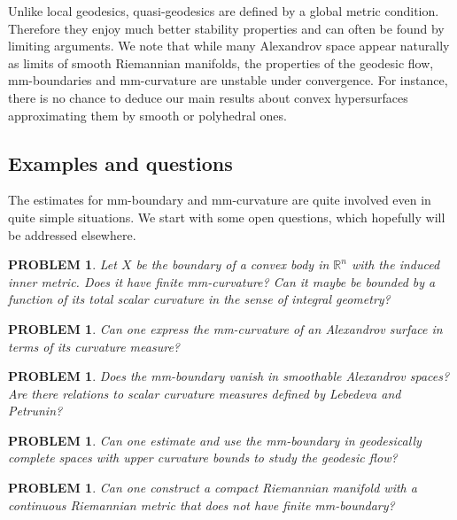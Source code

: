 \documentclass[12pt,leqno]{amsart}
\numberwithin{equation}{section}
\newtheorem{quest}[thm]{PROBLEM}
\theoremstyle{definition}
\theoremstyle{remark}
\newcommand{\R}{\mathbb{R}}
\begin{document}
Unlike local geodesics, quasi-geodesics are defined by a global metric condition. Therefore they enjoy much better stability properties
and can often be found by limiting arguments.
We note that while many Alexandrov space appear naturally  as limits of smooth Riemannian manifolds, the properties of the geodesic flow, mm-boundaries and mm-curvature are unstable under
convergence.  
For instance, there is  no chance to deduce our main results about convex hypersurfaces approximating them by smooth or polyhedral ones.



\subsection{Examples and questions} \label{subsec:example}
The estimates for mm-boundary and mm-curvature are quite involved even in  quite  simple situations.
We start with some open questions, which hopefully will be addressed elsewhere.










\begin{quest} Let $X$ be the boundary of a convex body in $\R ^n$ with the induced inner metric.
Does it have finite mm-curvature?  Can it maybe be bounded by a function of its total scalar curvature
in the sense of integral geometry?
\end{quest}


\begin{quest}
Can one express the mm-curvature of an Alexandrov  surface in terms of its curvature measure?
\end{quest}

\begin{quest}
Does the mm-boundary vanish  in smoothable Alexandrov spaces?   Are there relations to scalar curvature measures defined by Lebedeva and Petrunin?
\end{quest}


\begin{quest}
Can one estimate and use the mm-boundary in geodesically complete spaces with upper curvature bounds to study the geodesic flow?
\end{quest}



\begin{quest}
 Can one construct a compact Riemannian manifold with a continuous Riemannian metric
that does not have finite mm-boundary?
\end{quest}
\end{document}

